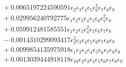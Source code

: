 \documentclass[10pt]{article}
\begin{document}
\begin{align*}
&{}  + 0.0065197224590591 \epsilon_{2} \epsilon_{3} \epsilon_{4} \epsilon_{5} \epsilon_{6}^{2} \epsilon_{7} \epsilon_{8} \epsilon_{9} \\
&{}  + 0.029956240792775 \epsilon_{1} \epsilon_{2} \epsilon_{3} \epsilon_{4} \epsilon_{5} \epsilon_{6} \epsilon_{7}^{2} \epsilon_{8} \\
&{}  + 0.059912481585551 \epsilon_{1} \epsilon_{2} \epsilon_{3} \epsilon_{4}^{2} \epsilon_{5} \epsilon_{6} \epsilon_{7} \epsilon_{8} \\
&{}  - 0.0014310299093417 \epsilon_{2}^{2} \epsilon_{3} \epsilon_{4} \epsilon_{5} \epsilon_{6} \epsilon_{7} \epsilon_{8} \epsilon_{9} \\
&{}  + 0.0099854135975918 \epsilon_{1} \epsilon_{2} \epsilon_{3} \epsilon_{4} \epsilon_{5} \epsilon_{6} \epsilon_{7} \epsilon_{8} \epsilon_{9} \\
&{}  + 0.0013039444918118 \epsilon_{10} \epsilon_{2} \epsilon_{3} \epsilon_{4} \epsilon_{5} \epsilon_{6} \epsilon_{7} \epsilon_{8} \epsilon_{9}
\end{align*}
\end{document}
